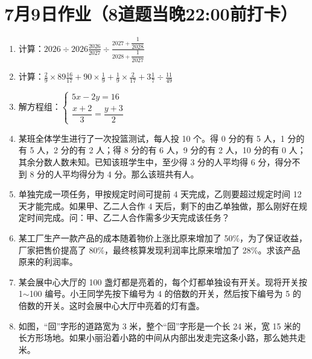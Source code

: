 \documentclass[UTF8,12pt,a4paper]{ctexart}
\newcommand{\BottomWriteSpace}{0.5cm}
\newenvironment{OnePageEightFill}{
  \small
  \vspace*{0pt}
  \begin{enumerate}[leftmargin=*, itemsep=0pt, topsep=0pt, parsep=0pt, partopsep=0pt]
  \setlength{\parskip}{0pt}
}{
  \end{enumerate}
  \vspace*{\BottomWriteSpace}
  \normalsize
  \newpage
}
\newcommand{\Q}[1]{\item #1\par\vfill}
\newcommand{\Qlast}[1]{\item #1\par}
\begin{document}
\section*{7月9日作业（8道题当晚22:00前打卡）}
\begin{OnePageEightFill}

\Q{计算：$\displaystyle 2026 \div 2026\frac{2026}{2027} \div \frac{2027 + \dfrac{1}{2028}}{2028 + \dfrac{1}{2027}}$}

\Q{计算：$\displaystyle \frac{2}{9} \times 89\frac{16}{17} + 90 \times \frac{1}{9} + \frac{1}{9} \times \frac{2}{17} + 3\frac{1}{7} \div \frac{11}{49}$}

\Q{解方程组：$\begin{cases} 5x - 2y = 16 \\ \dfrac{x+2}{3} = \dfrac{y+3}{2} \end{cases}$}

\Q{某班全体学生进行了一次投篮测试，每人投 10 个。得 0 分的有 5 人，1 分的有 5 人，2 分的有 2 人；得 8 分的有 6 人，9 分的有 2 人，10 分的有 0 人；其余分数人数未知。已知该班学生中，至少得 3 分的人平均得 6 分，得分不到 8 分的人平均得分为 4 分。那么该班共有\underline{\hspace{3em}}人。}

\Q{单独完成一项任务，甲按规定时间可提前 4 天完成，乙则要超过规定时间 12 天才能完成。如果甲、乙二人合作 4 天后，剩下的由乙单独做，那么刚好在规定时间完成。问：甲、乙二人合作需多少天完成该任务？}

\Q{某工厂生产一款产品的成本随着物价上涨比原来增加了 50\%，为了保证收益，厂家把售价提高了 80\%，最终核算发现利润率比原来增加了 28\%。求该产品原来的利润率。}

\Q{某会展中心大厅的 100 盏灯都是亮着的，每个灯都单独设有开关。现将开关按 1$\sim$100 编号。小王同学先按下编号为 4 的倍数的开关，然后按下编号为 5 的倍数的开关。这时会展中心大厅中亮着的灯有\underline{\hspace{3em}}盏。}

\Qlast{如图，“回”字形的道路宽为 3 米，整个“回”字形是一个长 24 米，宽 15 米的长方形场地。如果小丽沿着小路的中间从内部出发走完这条小路，那么她共走\underline{\hspace{3em}}米。}

\end{OnePageEightFill}

\end{document}
